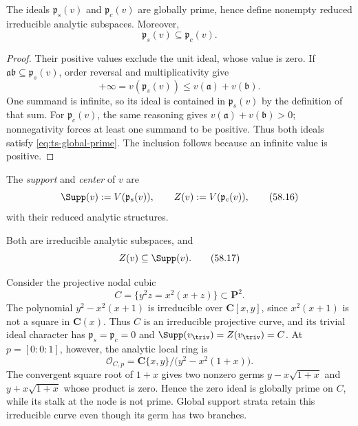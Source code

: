 \begin{proposition}\label{prop:ts-prime-support-center}
The ideals $\mathfrak p_s(v)$ and $\mathfrak p_c(v)$ are globally
prime, hence define nonempty reduced irreducible analytic subspaces.
Moreover,
\[
                         \mathfrak p_s(v)\subseteq\mathfrak p_c(v).
\tag{58.15}\label{eq:ts-prime-inclusion}
\]
\end{proposition}

\begin{proof}
Their positive values exclude the unit ideal, whose value is zero.
If $\mathfrak a\mathfrak b\subseteq\mathfrak p_s(v)$, order
reversal and multiplicativity give
\[
 +\infty=v(\mathfrak p_s(v))
       \leq v(\mathfrak a)+v(\mathfrak b).
\]
One summand is infinite, so its ideal is contained in
$\mathfrak p_s(v)$ by the definition of that sum.
For $\mathfrak p_c(v)$, the same reasoning gives
$v(\mathfrak a)+v(\mathfrak b)>0$; nonnegativity forces at
least one summand to be positive. Thus both ideals satisfy
\eqref{eq:ts-global-prime}. The inclusion follows because an
infinite value is positive.
\end{proof}

\begin{samepage}
\begin{definition}
\label{def:ts-support-center}
The \emph{support} and \emph{center} of $v$ are
\[
 \Supp(v):=V(\mathfrak p_s(v)),
 \qquad
 Z(v):=V(\mathfrak p_c(v)),
\tag{58.16}\label{eq:ts-support-center}
\]
with their reduced analytic structures.
\end{definition}
\end{samepage}

Both are irreducible analytic subspaces, and
\[
                              Z(v)\subseteq\Supp(v).
\tag{58.17}\label{eq:ts-center-in-support}
\]

\begin{example}
\label{ex:ts-node-global-prime}
Consider the projective nodal cubic
\[
             C=\{y^2z=x^2(x+z)\}\subset\mathbf P^2.
\]
The polynomial $y^2-x^2(x+1)$ is irreducible over $\mathbf C[x,y]$,
since $x^2(x+1)$ is not a square in $\mathbf C(x)$.
Thus $C$ is an irreducible projective curve, and its trivial
ideal character has $\mathfrak p_s=\mathfrak p_c=0$ and
$\Supp(v_{\triv})=Z(v_{\triv})=C$.
At $p=[0:0:1]$, however, the analytic local ring is
\[
 \mathcal O_{C,p}
   =\mathbf C\{x,y\}/\bigl(y^2-x^2(1+x)\bigr).
\]
The convergent square root of $1+x$ gives two nonzero germs
$y-x\sqrt{1+x}$ and $y+x\sqrt{1+x}$ whose product is zero.
Hence the zero ideal is globally prime on $C$, while its stalk
at the node is not prime. Global support strata retain this
irreducible curve even though its germ has two branches.
\end{example}

